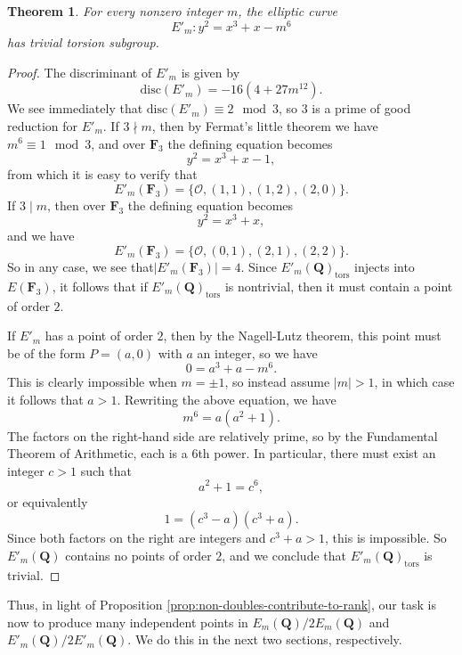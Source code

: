 \documentclass{amsart}
\newtheorem{theorem}{Theorem}[section]
\numberwithin{equation}{section}
\theoremstyle{remark}
\newcommand{\Z}{\mathbf{Z}}
\newcommand{\Q}{\mathbf{Q}}
\newcommand{\F}{\mathbf{F}}
\begin{document}
\begin{theorem}\label{thm:torsion-family-two}
For every nonzero integer $m$, the elliptic curve
\[
E'_m \colon y^2 = x^3 + x - m^6
\]
has trivial torsion subgroup.
\end{theorem}
\begin{proof}
The discriminant of $E'_m$ is given by
\[
\mathrm{disc}(E'_m)=-16(4+27m^{12}).
\]
We see immediately that $\mathrm{disc}(E'_m) \equiv 2 \mod 3$, so $3$ is a prime of good reduction for $E'_m$. If $3 \nmid m$, then by Fermat's little theorem we have $m^6 \equiv 1 \mod 3$, and over $\F_3$ the defining equation becomes
\[
y^2 = x^3 + x - 1,
\]
from which it is easy to verify that
\[
E'_m(\F_3)=\{ \mathcal{O}, (1,1), (1,2), (2,0)\}.
\]
If $3 \mid m$, then
over $\F_3$ the defining equation becomes
\[
y^2 = x^3 + x,
\]
and we have
\[
E'_m(\F_3)=\{ \mathcal{O}, (0,1), (2,1), (2,2)\}.
\]
So in any case, we see that$|E'_m(\F_3)|=4$.
Since $E'_m(\Q)_\mathrm{tors}$ injects into $E(\F_3)$, it follows that if $E'_m(\Q)_\mathrm{tors}$ is nontrivial, then it must contain a point of order $2$.
\iffalse By the Nagell-Lutz theorem, rational points of order $2$ on $E'_m$ are of the form $(a,0)$, where $a \in \Z$ . From the defining equation, we must then have
\[
m^6 = a^3 + a.
\]
But we have assumed $m$ is odd, while $a^3+a$ must be even. So $E'_m(\Q)$ contains no points of order $2$, and we conclude that $E'_m(\Q)_\mathrm{tors}$ is trivial.


\textbf{Here's an attempt at a proof for general $m$.}
\fi

If $E'_m$ has a point of order $2$, then by the Nagell-Lutz theorem, this point must be of the form $P=(a,0)$ with $a$ an integer, so we have
\[
0 = a^3 +a-m^6.
\]
This is clearly impossible when $m=\pm1$, so instead assume $|m|>1$, in which case it follows that $a > 1$. Rewriting the above equation, we have
\[
m^6 = a(a^2+1).
\]
The factors on the right-hand side are relatively prime, so by the Fundamental Theorem of Arithmetic, each is a $6$th power. In particular, there must exist an integer $c>1$ such that
\[
a^2+1 = c^6,
\]
or equivalently
\[
1=(c^3-a)(c^3+a).
\]
Since both factors on the right are integers and $c^3+a>1$, this is impossible. So $E'_m(\Q)$ contains no points of order $2$, and we conclude that $E'_m(\Q)_\mathrm{tors}$ is trivial.
\end{proof}

Thus, in light of Proposition \ref{prop:non-doubles-contribute-to-rank}, our task is now to produce many independent points in $E_m(\Q)/2E_m(\Q)$ and $E'_m(\Q)/2E'_m(\Q)$. We do this in the next two sections, respectively.
\end{document}
